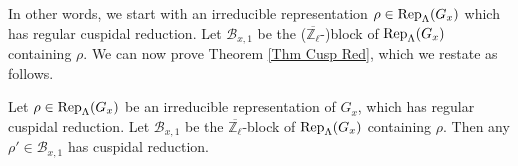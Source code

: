 	
	In other words, we start with an irreducible representation $\rho \in \operatorname{\operatorname{Rep}}_{\Lambda}(G_x)$ which has regular cuspidal reduction. Let $\mathcal{B}_{x,1}$ be the ($\overline{\mathbb{Z}_{\ell}}$-)block of $\operatorname{\operatorname{Rep}}_{\Lambda}(G_x)$ containing $\rho$. We can now prove Theorem \ref{Thm Cusp Red}, which we restate as follows.
	
	\begin{theorem} \label{Thm Cusp Red restate}
		Let $\rho \in \operatorname{\operatorname{Rep}}_{\Lambda}(G_x)$ be an irreducible representation of $G_x$, which has regular cuspidal reduction. Let $\mathcal{B}_{x,1}$ be the $\overline{\mathbb{Z}_{\ell}}$-block of $\operatorname{\operatorname{Rep}}_{\Lambda}(G_x)$ containing $\rho$. Then any $\rho' \in \mathcal{B}_{x,1}$ has cuspidal reduction.
	\end{theorem}
	

